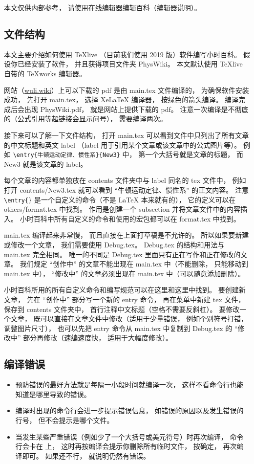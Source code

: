
本文仅供内部参考， 请使用\href{https://wuli.wiki/editor}{在线编辑器}编辑百科（编辑器说明）。

\subsection{文件结构}

本文主要介绍如何使用 TeXlive （目前我们使用 2019 版）软件编写小时百科。 假设你已经安装了软件， 并且获得项目文件夹 PhysWiki。 本文默认使用 TeXlive 自带的 TeXworks 编辑器。

网站（\href{https://wuli.wiki}{wuli.wiki}）上可以下载的 pdf 是由 main.tex 文件编译的， 为确保软件安装成功， 先打开 main.tex， 选择 XeLaTeX 编译器， 按绿色的箭头编译。 编译完成后会出现 PhysWiki.pdf， 就是网站上提供下载的 pdf。 注意一次编译是不彻底的（公式引用等超链接会显示问号）， 需要编译两次。

接下来可以了解一下文件结构， 打开 main.tex 可以看到文件中只列出了所有文章的中文标题和英文 label （label 用于引用某个文章或该文章中的公式图片等）。 例如 \verb|\entry{牛顿运动定律、惯性系}{New3}| 中， 第一个大括号就是文章的标题， 而 New3 就是该文章的 label。

每个文章的内容都单独放在 contents 文件夹中与 label 同名的 tex 文件中， 例如打开 contents/New3.tex 就可以看到 “牛顿运动定律、惯性系” 的正文内容。 注意 \verb|\entry{}| 是一个自定义的命令（不是 LaTeX 本来就有的）， 它的定义可以在 others/format.tex 中找到。 作用是创建一个 subsection 并将文章文件中的内容插入。 小时百科中所有自定义的命令和使用的宏包都可以在 format.tex 中找到。

main.tex 编译起来非常慢， 而且直接在上面打草稿是不允许的。 所以如果要新建或修改一个文章， 我们需要使用 Debug.tex。 Debug.tex 的结构和用法与 main.tex 完全相同。 唯一的不同是 Debug.tex 里面只有正在写作和正在修改的文章。 我们规定 “创作中” 的文章不能出现在 main.tex 中（不能删除， 只能移动到 main.tex 中）， “修改中” 的文章必须出现在 main.tex 中（可以随意添加删除）。

小时百科所用的所有自定义命令和编写规范可以在这里和这里中找到。 要创建新文章， 先在 “创作中” 部分写一个新的 entry 命令， 再在菜单中新建 tex 文件， 保存到 contents 文件夹中， 首行注释中文标题（空格不需要反斜杠）。 要修改一个文章， 既可以直接在文章文件中修改（适用于少量错误， 例如个别符号打错， 调整图片尺寸）， 也可以先把 entry 命令从 main.tex 中复制到 Debug.tex 的 “修改中” 部分再修改（速编速度快， 适用于大幅度修改）。

\subsection{编译错误}

\begin{itemize}
\item 预防错误的最好方法就是每隔一小段时间就编译一次， 这样不看命令行也能知道是哪里导致的错误。
\item 编译时出现的命令行会进一步提示错误信息， 如错误的原因以及发生错误的行号， 但不会提示是哪个文件。
\item 当发生某些严重错误（例如少了一个大括号或美元符号）时再次编译， 命令行会卡在 \verb|| 上， 这时再按编译会提示你删除所有临时文件， 按确定， 再次编译即可。 如果还不行， 就说明仍然有错误。
\end{itemize}
